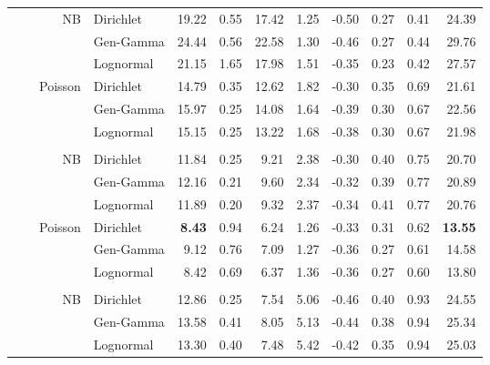 \documentclass[12pt]{article}
\begin{document}
\begin{table}[!htb]
\begin{tabular}{>{\raggedleft\arraybackslash}p{0.40in} | >{\raggedleft\arraybackslash}p{0.45in} | r | >{\raggedleft\arraybackslash}p{0.85in} | r r r r r r r r}
\\
 
& & \multirow{3}{*}{NB}
& \cellcolor{delayC!25}Dirichlet      & 19.22 & 0.55 & 17.42 & 1.25  & -0.50 & 0.27 & 0.41 & 24.39 \\
& & & \cellcolor{delayB!25}Gen-Gamma   & 24.44 & 0.56 & 22.58 & 1.30  & -0.46 & 0.27 & 0.44 & 29.76 \\
& & & \cellcolor{delayA!25}Lognormal   & 21.15 & 1.65 & 17.98 & 1.51  & -0.35 & 0.23 & 0.42 & 27.57 \\
 
\midrule
 
& \multirow{7}{*}{HSGP}
 
& \multirow{3}{*}{Poisson}
& \cellcolor{delayC!25}Dirichlet      & 14.79 & 0.35 & 12.62 & 1.82  & -0.30 & 0.35 & 0.69 & 21.61 \\
& & & \cellcolor{delayB!25}Gen-Gamma   & 15.97 & 0.25 & 14.08 & 1.64  & -0.39 & 0.30 & 0.67 & 22.56 \\
& & & \cellcolor{delayA!25}Lognormal   & 15.15 & 0.25 & 13.22 & 1.68  & -0.38 & 0.30 & 0.67 & 21.98 \\
 
\\
 
& & \multirow{3}{*}{NB}
& \cellcolor{delayC!25}Dirichlet      & 11.84 & 0.25 & 9.21  & 2.38  & -0.30 & 0.40 & 0.75 & 20.70 \\
& & & \cellcolor{delayB!25}Gen-Gamma   & 12.16 & 0.21 & 9.60  & 2.34  & -0.32 & 0.39 & 0.77 & 20.89 \\
& & & \cellcolor{delayA!25}Lognormal   & 11.89 & 0.20 & 9.32  & 2.37  & -0.34 & 0.41 & 0.77 & 20.76 \\
 
\midrule
 
& \multirow{7}{*}{SIR}
 
& \multirow{3}{*}{Poisson}
& \cellcolor{delayC!25}Dirichlet      & \bf 8.43 & 0.94 & 6.24  & 1.26  & -0.33 & 0.31 & 0.62 & \bf 13.55 \\
& & & \cellcolor{delayB!25}Gen-Gamma   & 9.12  & 0.76 & 7.09  & 1.27  & -0.36 & 0.27 & 0.61 & 14.58 \\
& & & \cellcolor{delayA!25}Lognormal   & 8.42  & 0.69 & 6.37  & 1.36  & -0.36 & 0.27 & 0.60 & 13.80 \\
 
\\
 
& & \multirow{3}{*}{NB}
& \cellcolor{delayC!25}Dirichlet      & 12.86 & 0.25 & 7.54  & 5.06  & -0.46 & 0.40 & 0.93 & 24.55 \\
& & & \cellcolor{delayB!25}Gen-Gamma   & 13.58 & 0.41 & 8.05  & 5.13  & -0.44 & 0.38 & 0.94 & 25.34 \\
& & & \cellcolor{delayA!25}Lognormal   & 13.30 & 0.40 & 7.48  & 5.42  & -0.42 & 0.35 & 0.94 & 25.03 \\
 

\end{tabular}
\end{table}
\end{document}
